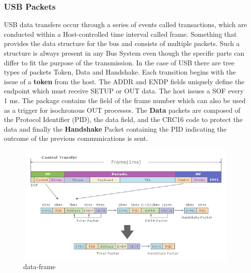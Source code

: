 \documentclass{article}
\begin{document}
\subsubsection{USB Packets}
USB data transfers occur through a series of events called transactions, which are conducted within a Host-controlled time interval called frame. Something that provides the data structure for the bus and consists of multiple packets. Such a structure is always present in any Bus System even though the specific parts can differ to fit the purpose of the transmission. In the case of USB there are tree types of packets Token, Data and Handshake. 
\newline
\newline
Each transition begins with the issue of a \textbf{token} from the host. The ADDR and ENDP fields uniquely define the endpoint which must receive SETUP or OUT data.
\newline
\newline
The host issues a SOF every 1 ms. The package contains the field of the frame number which can also be used as a trigger for isochronous OUT processes.
\newline
\newline
The \textbf{Data} packets are composed of the Protocol Identifier (PID), the data field, and the CRC16 code to protect the data and finally the \textbf{Handshake} Packet containing the PID indicating the outcome of the previous communications is sent.

    
    
    \begin{figure}[h]    
    \centering
    \includegraphics[width=13cm, height=6cm,center]{images/data-frame}
    \caption{data-frame}
\end{figure}

    
\end{document}
